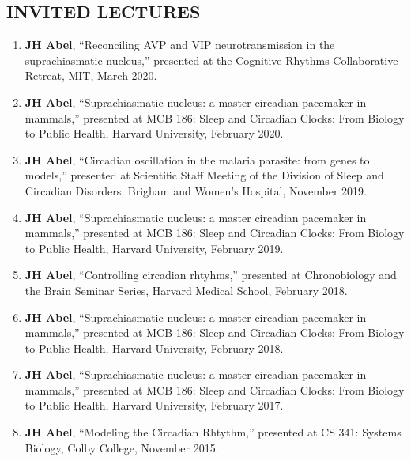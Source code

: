 \documentclass[line,10pt]{res}
\begin{document}
\begin{resume}
\section{\bf INVITED LECTURES}
\vspace{1em}\null
\begin{enumerate}
    \setlength\itemsep{0.8em}
    \item \textbf{JH Abel}, 
``Reconciling AVP and VIP neurotransmission in the suprachiasmatic nucleus,'' presented at the Cognitive Rhythms Collaborative Retreat, MIT, March 2020.
    \item \textbf{JH Abel}, 
``Suprachiasmatic nucleus: a master circadian pacemaker in mammals,'' presented at MCB 186: Sleep and Circadian Clocks: From Biology to Public Health, Harvard University, February 2020.
    \item \textbf{JH Abel}, 
``Circadian oscillation in the malaria parasite: from genes to models,'' presented at Scientific Staff Meeting of the Division of Sleep and Circadian Disorders, Brigham and Women's Hospital, November 2019.
\item \textbf{JH Abel}, 
``Suprachiasmatic nucleus: a master circadian pacemaker in mammals,'' presented at MCB 186: Sleep and Circadian Clocks: From Biology to Public Health, Harvard University, February 2019.
\item \textbf{JH Abel}, 
``Controlling circadian rhtyhms,'' presented at Chronobiology and the Brain Seminar Series, Harvard Medical School, February 2018.
\item \textbf{JH Abel}, 
``Suprachiasmatic nucleus: a master circadian pacemaker in mammals,'' presented at MCB 186: Sleep and Circadian Clocks: From Biology to Public Health, Harvard University, February 2018.
\item \textbf{JH Abel}, 
``Suprachiasmatic nucleus: a master circadian pacemaker in mammals,'' presented at MCB 186: Sleep and Circadian Clocks: From Biology to Public Health, Harvard University, February 2017.
    \item \textbf{JH Abel}, 
``Modeling the Circadian Rhtythm,'' presented at CS 341: Systems Biology, Colby College, November 2015.
\end{enumerate}


\end{resume}
\end{document}
